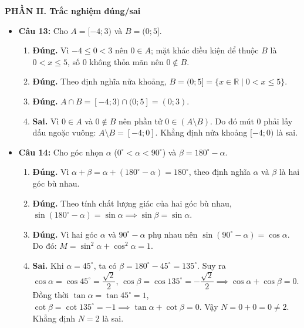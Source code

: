 \documentclass[12pt,a4paper]{article}
\begin{document}
\vspace{0.2cm}
\textbf{PHẦN II. Trắc nghiệm đúng/sai}
\begin{itemize}[leftmargin=0.6cm, itemsep=4pt]
    \item \textbf{Câu 13:} Cho $A = [-4; 3)$ và $B = (0; 5]$.
    \begin{enumerate}
        \item \textbf{Đúng.} Vì $-4 \le 0 < 3$ nên $0 \in A$; mặt khác điều kiện để thuộc $B$ là $0 < x \le 5$, số $0$ không thỏa mãn nên $0 \notin B$.
        \item \textbf{Đúng.} Theo định nghĩa nửa khoảng, $B = (0; 5] = \{x \in \mathbb{R} \mid 0 < x \le 5\}$.
        \item \textbf{Đúng.} $A \cap B = [-4; 3) \cap (0; 5] = (0; 3)$.
        \item \textbf{Sai.} Vì $0 \in A$ và $0 \notin B$ nên phần tử $0 \in (A \setminus B)$. Do đó mút $0$ phải lấy dấu ngoặc vuông: $A \setminus B = [-4; 0]$. Khẳng định nửa khoảng $[-4; 0)$ là sai.
    \end{enumerate}
    \item \textbf{Câu 14:} Cho góc nhọn $\alpha$ ($0^\circ < \alpha < 90^\circ$) và $\beta = 180^\circ - \alpha$.
    \begin{enumerate}
        \item \textbf{Đúng.} Vì $\alpha + \beta = \alpha + (180^\circ - \alpha) = 180^\circ$, theo định nghĩa $\alpha$ và $\beta$ là hai góc bù nhau.
        \item \textbf{Đúng.} Theo tính chất lượng giác của hai góc bù nhau, $\sin(180^\circ - \alpha) = \sin \alpha \implies \sin \beta = \sin \alpha$.
        \item \textbf{Đúng.} Vì hai góc $\alpha$ và $90^\circ - \alpha$ phụ nhau nên $\sin(90^\circ - \alpha) = \cos \alpha$. Do đó:
        $M = \sin^2 \alpha + \cos^2 \alpha = 1$.
        \item \textbf{Sai.} Khi $\alpha = 45^\circ$, ta có $\beta = 180^\circ - 45^\circ = 135^\circ$.
        Suy ra $\cos \alpha = \cos 45^\circ = \dfrac{\sqrt{2}}{2}$, $\cos \beta = \cos 135^\circ = -\dfrac{\sqrt{2}}{2} \implies \cos \alpha + \cos \beta = 0$.
        Đồng thời $\tan \alpha = \tan 45^\circ = 1$, $\cot \beta = \cot 135^\circ = -1 \implies \tan \alpha + \cot \beta = 0$.
        Vậy $N = 0 + 0 = 0 \ne 2$. Khẳng định $N = 2$ là sai.
    \end{enumerate}
\end{itemize}
\end{document}
